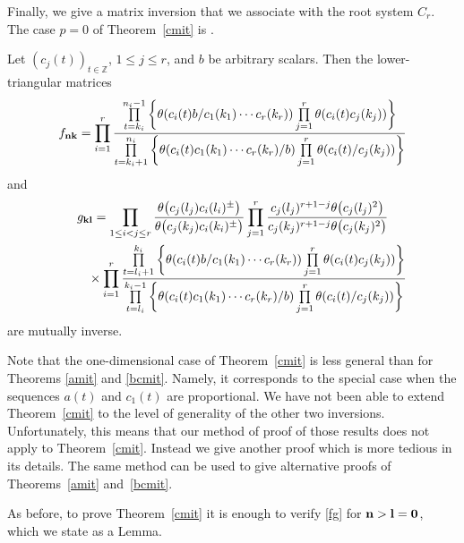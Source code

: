 Finally, we give a matrix inversion that we associate with the
root system $C_r$. The case $p=0$ of Theorem~\ref{cmit} is \cite[Theorem~4.1]{s}.

\begin{Theorem}\label{cmit}
Let $(c_j(t))_{t\in\mathbb Z}$, $1 \leq j \leq r$, and $b$ be arbitrary scalars. Then the lower-triangular matrices
\begin{gather*}f_{\bf nk}=\prod\limits_{i=1}^r\frac{\prod\limits_{t=k_i}^{n_i-1}
\bigg\{\theta(c_i(t)b/c_1(k_1)\dotsm c_r(k_r))\prod\limits_{j=1}^r\theta(c_i(t)c_j(k_j))\bigg\}}
{\prod\limits_{t=k_i+1}^{n_i} \bigg\{\theta(c_i(t)c_1(k_1)\dotsm c_r(k_r)/b)
\prod\limits_{j=1}^r\theta(c_i(t)/c_j(k_j))\bigg\}}
\end{gather*}
and
\begin{gather*}
g_{\bf kl}=
\prod\limits_{1\leq i<j\leq r}\frac{\theta\big(c_j(l_j)c_i(l_i)^\pm\big)}
{\theta\big(c_j(k_j)c_i(k_i)^\pm\big)}
\prod\limits_{j=1}^r\frac{c_j(l_j)^{r+1-j}\theta\big(c_j(l_j)^2\big)}
{c_j(k_j)^{r+1-j}\theta\big(c_j(k_j)^2\big)}
\\ \phantom{g_{\bf kl}=}{}
\times\prod\limits_{i=1}^r\frac{\prod\limits_{t=l_i+1}^{k_i}
\bigg\{\theta(c_i(t)b/c_1(k_1)\dotsm
 c_r(k_r))\prod\limits_{j=1}^r\theta(c_i(t)c_j(k_j))\bigg\}}
{\prod\limits_{t=l_i}^{k_i-1}
\bigg\{\theta(c_i(t)c_1(k_1)\dotsm c_r(k_r)/b)
\prod\limits_{j=1}^r\theta(c_i(t)/c_j(k_j))\bigg\}}
\end{gather*}
are mutually inverse.
\end{Theorem}



Note that the one-dimensional case of Theorem~\ref{cmit} is less
general than for Theorems \ref{amit} and \ref{bcmit}. Namely, it
corresponds to the special case when the sequences $a(t)$ and $c_1(t)$
are proportional. We have not been able to extend
Theorem~\ref{cmit} to the level of generality of the
other two inversions. Unfortunately, this means that our method of
proof of those results does not apply to Theorem~\ref{cmit}.
Instead we give another proof which
is more tedious in its details. The same method can be used to
give alternative proofs of
 Theorems~\ref{amit} and~\ref{bcmit}.

As before, to prove Theorem~\ref{cmit}
it is enough to verify \eqref{fg}
for ${\bf n}>\bf l=\bf 0$, which we state as a Lemma.

